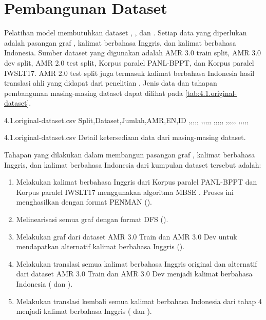 \section{Pembangunan Dataset}

Pelatihan model \amrparsing{} membutuhkan dataset , , dan .
Setiap data yang diperlukan adalah pasangan graf \AMR{}, kalimat berbahasa Inggris, dan kalimat berbahasa Indonesia.
Sumber dataset yang digunakan adalah AMR 3.0 train split, AMR 3.0 dev split, AMR 2.0 test split, Korpus paralel PANL-BPPT, dan Korpus paralel IWSLT17.
AMR 2.0 test split juga termasuk kalimat berbahasa Indonesia hasil translasi ahli yang didapat dari penelitian \textcite{putra2022}.
Jenis data dan tahapan pembangunan masing-masing dataset dapat dilihat pada \cref{tab:4.1.original-dataset}.

\begin{filecontents*}{4.1.original-dataset.csv}
  Split,Dataset,Jumlah,AMR,EN,ID
  ,,,,\checkmark{},\checkmark{}
  ,,,,\checkmark{},\checkmark{}
  ,,,\checkmark{},\checkmark{},
  ,,,\checkmark{},\checkmark{},
  ,,,\checkmark{},\checkmark{},\checkmark{}
\end{filecontents*}
  {4.1.original-dataset.csv}
  {Detail ketersediaan data dari masing-masing dataset.}

Tahapan yang dilakukan dalam membangun pasangan graf \AMR{}, kalimat berbahasa Inggris, dan kalimat berbahasa Indonesia dari kumpulan dataset tersebut adalah:

\begin{enumerate}
  \item Melakukan \amrparsing{} kalimat berbahasa Inggris dari Korpus paralel PANL-BPPT dan Korpus paralel IWSLT17 menggunakan algoritma MBSE .
  Proses ini menghasilkan \AMR{} dengan format PENMAN ().
  \item Melinearisasi semua graf \AMR{} dengan format DFS ().
  \item Melakukan \AMRtoTEXT{} graf \AMR{} dari dataset AMR 3.0 Train dan AMR 3.0 Dev untuk mendapatkan alternatif kalimat berbahasa Inggris ().
  \item Melakukan translasi semua kalimat berbahasa Inggris original dan alternatif dari dataset AMR 3.0 Train dan AMR 3.0 Dev menjadi kalimat berbahasa Indonesia ( dan ).
  \item Melakukan translasi kembali semua kalimat berbahasa Indonesia dari tahap 4 menjadi kalimat berbahasa Inggris ( dan ).
\end{enumerate}

